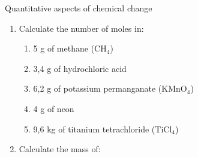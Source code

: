 \begin{eocexercises}{Quantitative aspects of chemical change}
\begin{enumerate}[noitemsep, label=\textbf{\arabic*}. ]
\begin{enumerate}[noitemsep, label=\textbf{\alph*}. ]
\begin{enumerate}[noitemsep, label=\textbf{\roman*}. ]
\label{m38712*uid136}\item 0,063 g
\end{enumerate}
              \label{m38712*uid137}\item In the compound potassium sulphate ($\text{K}{}_{2}\text{SO}{}_{4}$), oxygen makes up x\% of the mass of the compound. x = ...
\label{m38712*id286432}\begin{enumerate}[noitemsep, label=\textbf{\roman*}. ] 
            \label{m38712*uid138}\item 36.8
\label{m38712*uid139}\item 9,2
\label{m38712*uid140}\item 4
\label{m38712*uid141}\item 18,3
\end{enumerate}
               \label{m38712*uid142}\item The concentration of a $150\phantom{\rule{2pt}{0ex}}{\text{cm}}^{3}$ solution, containing 5 g of $\text{NaCl}$ is...
\label{m38712*id286512}\begin{enumerate}[noitemsep, label=\textbf{\roman*}. ] 
            \label{m38712*uid143}\item $0,09\phantom{\rule{2pt}{0ex}}\text{M}$
\label{m38712*uid144}\item $5,7\phantom{\rule{2pt}{0ex}}\ensuremath{\times}10{}^{-4}\phantom{\rule{2pt}{0ex}}\text{M}$
\label{m38712*uid145}\item $0,57\phantom{\rule{2pt}{0ex}}\text{M}$
\label{m38712*uid146}\item $0,03\phantom{\rule{2pt}{0ex}}\text{M}$
\end{enumerate}
                \end{enumerate}
        \item Calculate the number of moles in:
\label{m38712*id6342}\begin{enumerate}[noitemsep, label=\textbf{\alph*}. ] 
            \item 5 g of methane (${\text{CH}}_{4}$)\item 3,4 g of hydrochloric acid\item 6,2 g of potassium permanganate (${\text{KMnO}}_{4}$)\item 4 g of neon\item 9,6 kg of titanium tetrachloride (${\text{TiCl}}_{4}$)\end{enumerate}
       \item Calculate the mass of:\label{m38712*id7342}\begin{enumerate}[noitemsep, label=\textbf{\alph*}. ] 

\end{enumerate}
\end{enumerate}
\end{eocexercises}
